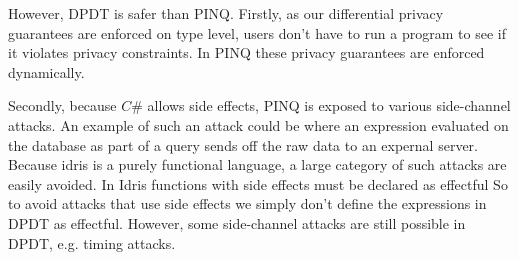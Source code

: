 \documentclass[12pt]{article}
\begin{document}
However, DPDT is safer than PINQ.
Firstly, as our differential privacy guarantees are enforced on type level, users don't have to run a program to see if it violates privacy constraints.
In PINQ these privacy guarantees are enforced dynamically.

Secondly, because $C\#$ allows side effects, PINQ is exposed to various side-channel attacks.
An example of such an attack could be where an expression evaluated on the database as part of a query sends off the raw data to an expernal server.
Because idris is a purely functional language, a large category of such attacks are easily avoided.
In Idris functions with side effects must be declared as effectful
So to avoid attacks that use side effects we simply don't define the expressions in DPDT as effectful.
However, some side-channel attacks are still possible in DPDT, e.g. timing attacks.



\end{document}
